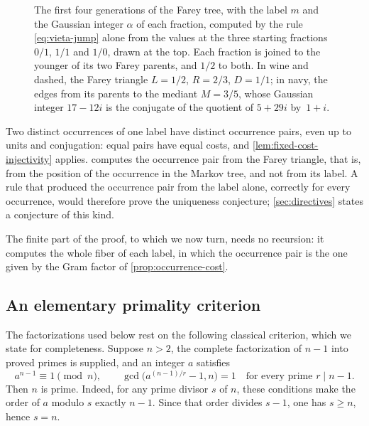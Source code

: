 \begin{figure}[tb]
\centering

\caption{The first four generations of the Farey tree, with the label $m$
and the Gaussian integer $\alpha$ of each fraction, computed by the rule
\eqref{eq:vieta-jump} alone from the values at the three starting fractions
$0/1$, $1/1$ and $1/0$, drawn at the top. Each fraction is joined to the younger of its
two Farey parents, and $1/2$ to both. In wine and dashed, the Farey triangle
$L=1/2$, $R=2/3$, $D=1/1$; in navy, the edges from its parents to the
mediant $M=3/5$, whose Gaussian integer $17-12i$ is the conjugate of the
quotient of $5+29i$ by~$1+i$.}
\label{fig:vieta-tree}
\end{figure}

\begin{remark}\label{rem:pair-determines}
Two distinct occurrences of one label have distinct occurrence pairs, even
up to units and conjugation: equal pairs have equal costs, and
\cref{lem:fixed-cost-injectivity} applies.  computes the
occurrence pair from the Farey triangle, that is, from the position of the
occurrence in the Markov tree, and not from its label. A rule that produced
the occurrence pair from the label alone, correctly for every occurrence,
would therefore prove the uniqueness conjecture; \cref{sec:directives}
states a conjecture of this kind.
\end{remark}

The finite part of the proof, to which we now turn, needs no recursion: it
computes the whole fiber of each label, in which the occurrence pair is the
one given by the Gram factor of \cref{prop:occurrence-cost}.

\subsection{An elementary primality criterion}

The factorizations used below rest on the following classical criterion,
which we state for completeness. Suppose $n>2$, the complete factorization of $n-1$ into proved
primes is supplied, and an integer $a$ satisfies
\begin{equation}\label{eq:full-lucas}
 a^{n-1}\equiv1\pmod n,\qquad
 \gcd\bigl(a^{(n-1)/r}-1,n\bigr)=1
 \quad\text{for every prime }r\mid n-1.
\end{equation}
Then $n$ is prime. Indeed, for any prime divisor $s$ of $n$, these
conditions make the order of $a$ modulo $s$ exactly $n-1$. Since that
order divides $s-1$, one has $s\geqslant n$, hence $s=n$.

